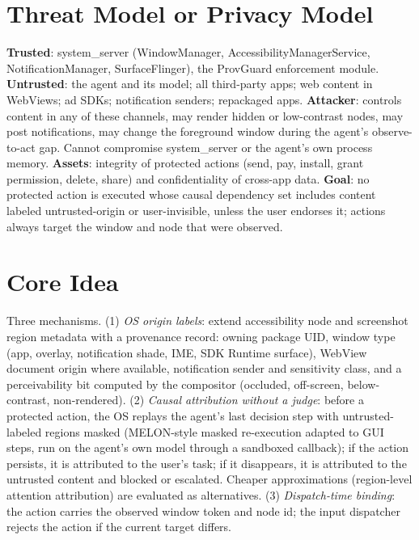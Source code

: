 \documentclass[11pt]{article}
\begin{document}
\section{Threat Model or Privacy Model}
\textbf{Trusted}: system\_server (WindowManager, AccessibilityManagerService, NotificationManager, SurfaceFlinger), the ProvGuard enforcement module. \textbf{Untrusted}: the agent and its model; all third-party apps; web content in WebViews; ad SDKs; notification senders; repackaged apps. \textbf{Attacker}: controls content in any of these channels, may render hidden or low-contrast nodes, may post notifications, may change the foreground window during the agent's observe-to-act gap. Cannot compromise system\_server or the agent's own process memory. \textbf{Assets}: integrity of protected actions (send, pay, install, grant permission, delete, share) and confidentiality of cross-app data. \textbf{Goal}: no protected action is executed whose causal dependency set includes content labeled untrusted-origin or user-invisible, unless the user endorses it; actions always target the window and node that were observed.

\section{Core Idea}
Three mechanisms. (1) \emph{OS origin labels}: extend accessibility node and screenshot region metadata with a provenance record: owning package UID, window type (app, overlay, notification shade, IME, SDK Runtime surface), WebView document origin where available, notification sender and sensitivity class, and a perceivability bit computed by the compositor (occluded, off-screen, below-contrast, non-rendered). (2) \emph{Causal attribution without a judge}: before a protected action, the OS replays the agent's last decision step with untrusted-labeled regions masked (MELON-style masked re-execution adapted to GUI steps, run on the agent's own model through a sandboxed callback); if the action persists, it is attributed to the user's task; if it disappears, it is attributed to the untrusted content and blocked or escalated. Cheaper approximations (region-level attention attribution) are evaluated as alternatives. (3) \emph{Dispatch-time binding}: the action carries the observed window token and node id; the input dispatcher rejects the action if the current target differs.
\end{document}
